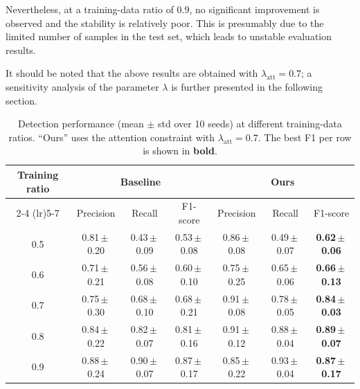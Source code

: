 \documentclass[lettersize,journal]{IEEEtran}
\begin{document}
Nevertheless, at a training-data ratio of 0.9, no significant improvement is observed 
and the stability is relatively poor. 
This is presumably due to the limited number of samples in the test set, 
which leads to unstable evaluation results. 

It should be noted that the above results are obtained with $\lambda_{\mathrm{att}}=0.7$; 
a sensitivity analysis of the parameter $\lambda$ is further presented in the following section.

\begin{table}[]
\centering
\caption{Detection performance (mean $\pm$ std over 10 seeds) at different
training-data ratios. ``Ours'' uses the attention constraint with
$\lambda_{\mathrm{att}}=0.7$. The best F1 per row is shown in \textbf{bold}.}
\label{tab:bbox_results}
\setlength{\tabcolsep}{4pt}
\renewcommand{\arraystretch}{1.2}
\begin{tabular}{c ccc ccc}
\toprule
\multirow{2}{*}{Training ratio} &
\multicolumn{3}{c}{Baseline} &
\multicolumn{3}{c}{Ours} \\
\cmidrule(lr){2-4} \cmidrule(lr){5-7}
 & Precision & Recall & F1-score
 & Precision & Recall & F1-score \\
\midrule
0.5 & 0.81\,$\pm$\,0.20 & 0.43\,$\pm$\,0.09 & 0.53\,$\pm$\,0.08
    & 0.86\,$\pm$\,0.08 & 0.49\,$\pm$\,0.07 & \textbf{0.62\,$\pm$\,0.06} \\
0.6 & 0.71\,$\pm$\,0.21 & 0.56\,$\pm$\,0.08 & 0.60\,$\pm$\,0.10
    & 0.75\,$\pm$\,0.25 & 0.65\,$\pm$\,0.06 & \textbf{0.66\,$\pm$\,0.13} \\
0.7 & 0.75\,$\pm$\,0.30 & 0.68\,$\pm$\,0.10 & 0.68\,$\pm$\,0.21
    & 0.91\,$\pm$\,0.08 & 0.78\,$\pm$\,0.05 & \textbf{0.84\,$\pm$\,0.03} \\
0.8 & 0.84\,$\pm$\,0.22 & 0.82\,$\pm$\,0.07 & 0.81\,$\pm$\,0.16
    & 0.91\,$\pm$\,0.12 & 0.88\,$\pm$\,0.04 & \textbf{0.89\,$\pm$\,0.07} \\
0.9 & 0.88\,$\pm$\,0.24 & 0.90\,$\pm$\,0.07 & 0.87\,$\pm$\,0.17
    & 0.85\,$\pm$\,0.22 & 0.93\,$\pm$\,0.04 & \textbf{0.87\,$\pm$\,0.17} \\
\bottomrule
\end{tabular}
\end{table}

\end{document}
